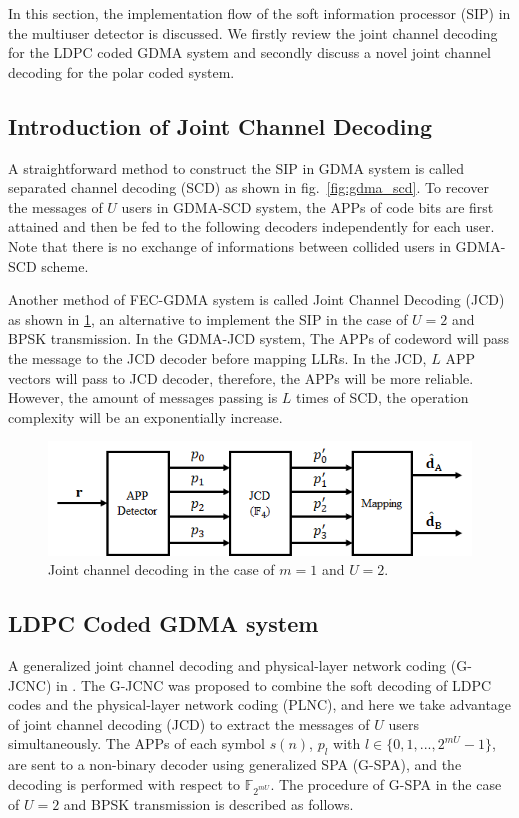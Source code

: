 In this section, the implementation flow of the soft information processor (SIP) in the multiuser detector is discussed. We firstly review the joint channel decoding for the LDPC coded GDMA system and secondly discuss a novel joint channel decoding for the polar coded system.


\subsection{Introduction of Joint Channel Decoding}

A straightforward method to construct the SIP in GDMA system is called separated channel decoding (SCD) as shown in fig.~\ref{fig:gdma_scd}. To recover the messages of $U$ users in GDMA-SCD system, the APPs of code bits are first attained and then be fed to the following decoders independently for each user. Note that there is no exchange of informations between collided users in GDMA-SCD scheme.

Another method of FEC-GDMA system is called Joint Channel Decoding (JCD) as shown in \ref{fig:gdma_jcd}, an alternative to implement the SIP in the case of $U=2$ and BPSK transmission. In the GDMA-JCD system, The APPs of codeword will pass the message to the JCD decoder before mapping LLRs. In the JCD, $L$ APP vectors will pass to JCD decoder, therefore, the APPs will be more reliable. However, the amount of messages passing is $L$ times of SCD, the operation complexity will be an exponentially increase.


\begin{figure}[t!]
 \centering
 \includegraphics[width=15cm]{fig/gdma_jcd.png}
 \caption{Joint channel decoding in the case of $m=1$ and $U=2$.}
 \label{fig:gdma_jcd}
\end{figure}

\subsection{LDPC Coded GDMA system}

A generalized joint channel decoding and physical-layer network coding (G-JCNC) in \cite{gjcnc10}. The G-JCNC was proposed to combine the soft decoding of LDPC codes and the physical-layer network coding (PLNC), and here we take advantage of joint channel decoding (JCD) to extract the messages of $U$ users simultaneously. The APPs of each symbol $s(n)$, $p_l$ with $l \in \{0, 1, ..., 2^{mU}-1\}$, are sent to a non-binary decoder using generalized SPA (G-SPA), and the decoding is performed with respect to $\mathbb{F}_{2^{mU}}$. The procedure of G-SPA in the case of $U=2$ and BPSK transmission is described as follows.


